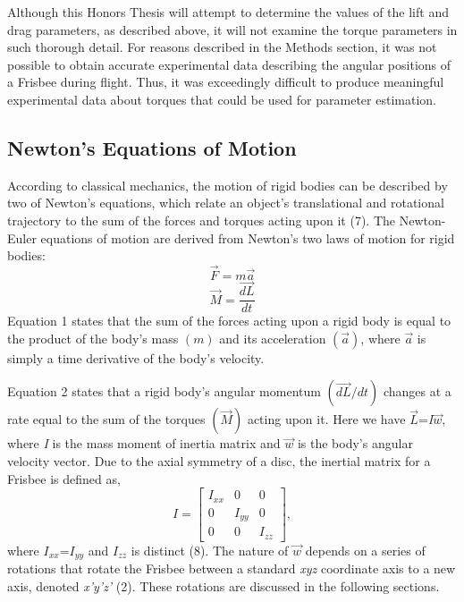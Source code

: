 \documentclass[a4paper,12pt, oneside]{article}
\begin{document}
Although this Honors Thesis will attempt to determine the values of the lift and drag parameters, as described above, it will not examine the torque parameters in such thorough detail. For reasons described in the Methods section, it was not possible to obtain accurate experimental data describing the angular positions of a Frisbee during flight. Thus, it was exceedingly difficult to produce meaningful experimental data about torques that could be used for parameter estimation.

\subsection{Newton's Equations of Motion} 

According to classical mechanics, the motion of rigid bodies can be described by two of Newton's equations, which relate an object's translational and rotational trajectory to the sum of the forces and torques acting upon it (7).  The Newton-Euler equations of motion are derived from Newton's two laws of motion for rigid bodies:
\begin{equation}
\vec{F}=\textit{m}\vec{a}
\end{equation}
\begin{equation}
\vec{M}=\dfrac{\vec{dL}}{dt}
\end{equation}
Equation 1 states that the sum of the forces acting upon a rigid body is equal to the product of the body's mass $(\textit{m})$ and its acceleration $(\vec{a})$, where $\vec{a}$ is simply a time derivative of the body's velocity.  

Equation 2 states that a rigid body's angular momentum $(\vec{dL}/dt)$ changes at a rate equal to the sum of the torques $(\vec{M})$ acting upon it. Here we have $\vec{L}$=\textit{I}$\vec{w}$, where \textit{I} is the mass moment of inertia matrix and $\vec{w}$ is the body's angular velocity vector. Due to the axial symmetry of a disc, the inertial matrix for a Frisbee is defined as,  
\begin{equation*}
I=\begin{bmatrix}
I_{xx} & 0 & 0 \\
0 & I_{yy} & 0 \\ 
0 & 0 & I_{zz}
\end{bmatrix},
\end{equation*}
where $I_{xx}$=$I_{yy}$ and $I_{zz}$ is distinct (8).  The nature of $\vec{w}$ depends on a series of rotations that rotate the Frisbee between a standard \textit{xyz} coordinate axis to a new axis, denoted \textit{x'y'z'} (2). These rotations are discussed in the following sections.
\end{document}
